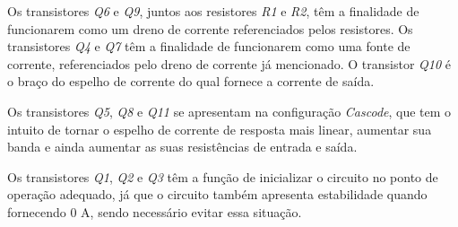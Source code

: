 Os transistores \textit{Q6} e \textit{Q9}, juntos aos resistores \textit{R1} e \textit{R2}, t\^em a finalidade de funcionarem como um dreno de corrente referenciados pelos resistores. Os transistores \textit{Q4} e \textit{Q7} t\^em a finalidade de funcionarem como uma fonte de corrente, referenciados pelo dreno de corrente j\'a mencionado. O transistor \textit{Q10} \'e o braço do espelho de corrente do qual fornece a corrente de sa\'ida.

Os transistores \textit{Q5}, \textit{Q8} e \textit{Q11} se apresentam na configuração \textit{Cascode}, que tem o intuito de tornar o espelho de corrente de resposta mais linear, aumentar sua banda e ainda aumentar as suas resist\^encias de entrada e sa\'ida.

Os transistores \textit{Q1}, \textit{Q2} e \textit{Q3} t\^em a função de inicializar o circuito no ponto de operação adequado, j\'a que o circuito tamb\'em apresenta estabilidade quando fornecendo 0 A, sendo necess\'ario evitar essa situação.
